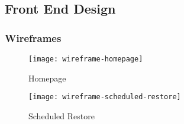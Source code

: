 	\subsection{Front End Design}
	\subsubsection{Wireframes}
		\begin{figure}[H]
			\setlength{\belowcaptionskip}{15pt plus 3pt minus 2pt}
			\caption{Homepage}
			\centering
			\texttt{[image: wireframe-homepage]}
			\label{fig:homepage}
		\end{figure}
		
		\begin{figure}[H]
			\setlength{\belowcaptionskip}{15pt plus 3pt minus 2pt}
			\caption{Scheduled Restore}
			\centering
			\texttt{[image: wireframe-scheduled-restore]}
			\label{fig:scheduled}
		\end{figure}
	
	